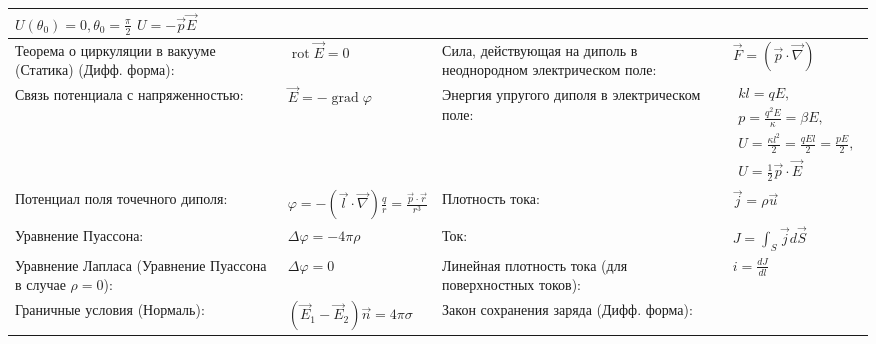 \documentclass{article}
\begin{document}
\begin{tabular}{ |p{6cm}|p{3.5cm}|p{6cm}|p{3.5cm}|  }
$U\left(\theta_{0}\right)=0, \theta_{0} = \frac{\pi}{2}$ $U=-\vec{p} \vec{E}$ \\
\hline
Теорема о циркуляции в вакууме (Статика) (Дифф. форма):                    &
$\operatorname{rot} {\vec E}=0$                                            &
Сила, действующая на диполь в неоднородном электрическом поле:             &
$\vec{F}=(\vec{p} \cdot \vec\nabla)$                                       \\
\hline
Связь потенциала с напряженностью:                                         &
$\vec E=-\operatorname{grad} \varphi$                                      &
Энергия упругого диполя в электрическом поле:                              &
$\begin{aligned}
k l=q E,                                                                   \\
p=\frac{q^{2} E}{\kappa}=\beta E,                                          \\
U=\frac{\kappa l^{2}}{2}=\frac{q E l}{2}=\frac{p E}{2},                    \\
U=\frac{1}{2} \vec{p} \cdot \vec{E}
\end{aligned}$                                                             \\
\hline
Потенциал поля точечного диполя:                                           &
$\varphi = -({\vec l} \cdot {\vec \nabla}) \frac{q}{r}=\frac{{\vec p} \cdot {\vec r}}{r^{3}}$ &
Плотность тока:                                                            &
$\vec{j}=\rho \vec{u}$                                                     \\
\hline
Уравнение Пуассона:                                                        &
$\Delta \varphi=-4 \pi \rho$                                               &
Ток:                                                                       &
$J=\int_{S} \vec{j} d \vec{S}$                                             \\
\hline
Уравнение Лапласа (Уравнение Пуассона в случае $\rho = 0$):                &
$\Delta \varphi=0$                                                         &
Линейная плотность тока (для поверхностных токов):                         &
$i = \frac{d{J}}{d{l}}$                                                    \\
\hline
Граничные условия (Нормаль):                                               &
$\left(\vec{E}_{1}-\vec{E}_{2}\right) \vec n =4 \pi \sigma$                &
Закон сохранения заряда (Дифф. форма):                                     &

\end{tabular}
\end{document}
